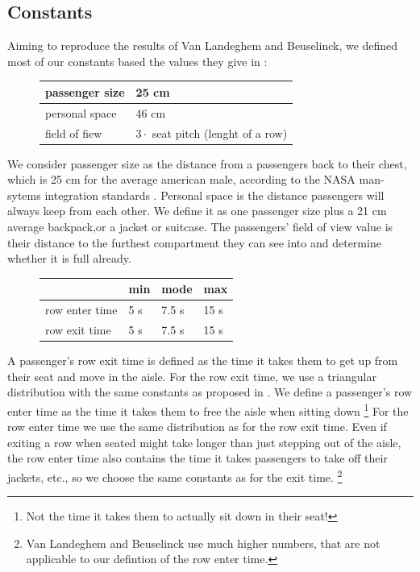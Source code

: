 \documentclass[11pt]{article}
\begin{document}
\subsection{Constants}
Aiming to reproduce the results of Van Landeghem and Beuselinck, we defined most of our constants based the values they give in \cite{beus}:

\begin{figure}[h!]
	\center
\begin{tabular}{l|l}
	\hline
	passenger size & 25 cm \\
	\hline
	personal space & 46 cm\\
	\hline
	field of fiew & $3 \cdot$ seat pitch (lenght of a row)\\
	\hline
\end{tabular}
\end{figure}
We consider passenger size as the distance from a passengers back to their chest, which is 25 cm for the average american male, according to the NASA man-sytems integration standards \cite{nasa}. Personal space is the distance passengers will always keep from each other. We define it as one passenger size plus a 21 cm average backpack,or a jacket or suitcase.
	The passengers' field of view value is their distance to the furthest compartment they can see into and determine whether it is full already.

\begin{figure}[h!]
	\center
\begin{tabular}{l|l l l}

	&min &mode&max \\
	\hline
row enter time & 5 s &7.5 s & 15 s \\
	\hline
	row exit time& 5 s &7.5 s & 15 s \\
	\hline
\end{tabular}
\end{figure}
A passenger's row exit time is defined as the time it takes them to get up from their seat and move in the aisle. For the row exit time, we use a triangular distribution with the same constants as proposed in \cite{beus}. We define a passenger's row enter time as the time it takes them to free the aisle when sitting down \footnote{Not the time it takes them to actually sit down in their seat!} For the row enter time we use the same distribution as for the row exit time. Even if exiting a row when seated might take longer than just stepping out of the aisle, the row enter time also contains the time it takes passengers to take off their jackets, etc., so we choose the same constants as for the exit time. \footnote{Van Landeghem and Beuselinck use much higher numbers, that are not applicable to our defintion of the row enter time.}
\end{document}

